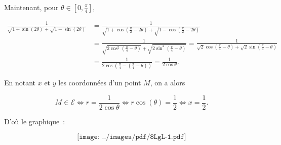 {{Maintenant, pour $\theta\in[0,\frac{\pi}{4}]$,

\begin{align*}
\frac{1}{\sqrt{1+\sin(2\theta)}+\sqrt{1-\sin(2\theta)}}&=
\frac{1}{\sqrt{1+\cos(\frac{\pi}{2}-2\theta)}+\sqrt{1-\cos(\frac{\pi}{2}-2\theta)}}\\
 &=\frac{1}{\sqrt{2\cos^2(\frac{\pi}{4}-\theta)}+\sqrt{2\sin^2(\frac{\pi}{4}-\theta)}}
 =\frac{1}{\sqrt{2}\cos(\frac{\pi}{4}-\theta)+\sqrt{2}\sin(\frac{\pi}{4}-\theta)}\\
 &=\frac{1}{2\cos(\frac{\pi}{4}-(\frac{\pi}{4}-\theta))}=\frac{1}{2\cos\theta}.
\end{align*}

En notant $x$ et $y$ les coordonnées d'un point $M$, on a alors 

$$M\in\mathcal{E}\Leftrightarrow r=\frac{1}{2\cos\theta}\Leftrightarrow r\cos(\theta)=\frac{1}{2}\Leftrightarrow x=\frac{1}{2}.$$

D'où le graphique~:

$$\texttt{[image: ../images/pdf/8LgL-1.pdf]}$$
}
}
